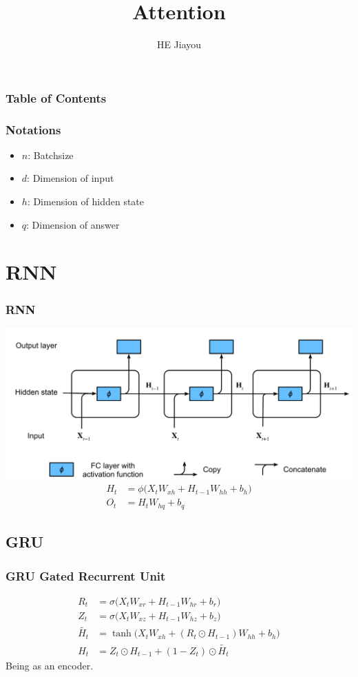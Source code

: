 \documentclass[]{beamer}
\title[]{Attention}
\author{HE Jiayou}
\begin{document}
\frame{\titlepage}

\begin{frame}
    \frametitle{Table of Contents}
    \tableofcontents
\end{frame}

\begin{frame}
    \frametitle{Notations}
    \begin{itemize}
        \item $n$: Batchsize
        \item $d$: Dimension of input
        \item $h$: Dimension of hidden state
        \item $q$: Dimension of answer
    \end{itemize}
\end{frame}

\section{RNN}
\begin{frame}
    \frametitle{RNN}
    \includegraphics[scale = 0.2]{RNN.png}
    \begin{align*}
        H_t &= \phi\bigl(X_t W_{xh} + H_{t-1}W_{hh} + b_h\bigr) \\
        O_t &= H_t W_{hq} + b_q
    \end{align*}
\end{frame}

\subsection{GRU}
\begin{frame}
    \frametitle{GRU\: Gated Recurrent Unit}
    \begin{align*}
        R_t &= \sigma\bigl(X_t W_{xr} + H_{t-1}W_{hr} + b_r\bigr) \\
        Z_t &= \sigma\bigl(X_t W_{xz} + H_{t-1}W_{hz} + b_z\bigr) \\
        \tilde{H_t} &= \tanh \bigl(X_t W_{xh} + (R_t \odot H_{t-1})W_{hh} + b_h\bigr) \\
        H_t &= Z_t \odot H_{t-1} + (1-Z_t) \odot \tilde{H_t} 
    \end{align*}
    Being as an encoder.
\end{frame}
\end{document}
